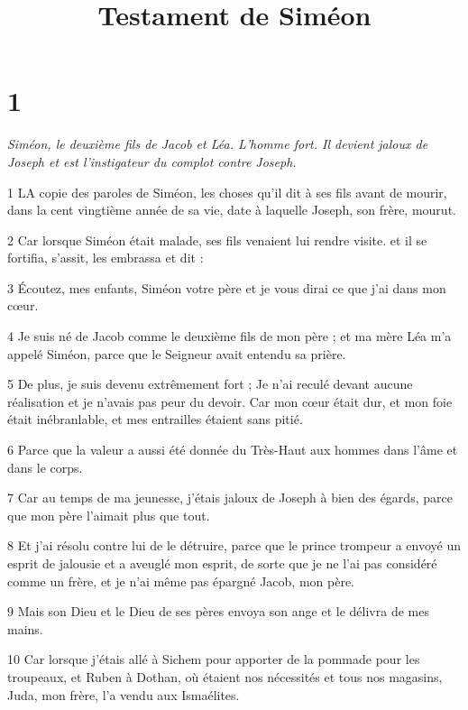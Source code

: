 

\title{Testament de Siméon}

\chapter{1}

\par \textit{Siméon, le deuxième fils de Jacob et Léa. L'homme fort. Il devient jaloux de Joseph et est l'instigateur du complot contre Joseph.}

\par 1 LA copie des paroles de Siméon, les choses qu'il dit à ses fils avant de mourir, dans la cent vingtième année de sa vie, date à laquelle Joseph, son frère, mourut.

\par 2 Car lorsque Siméon était malade, ses fils venaient lui rendre visite. et il se fortifia, s'assit, les embrassa et dit :

\par 3 Écoutez, mes enfants, Siméon votre père et je vous dirai ce que j'ai dans mon cœur.

\par 4 Je suis né de Jacob comme le deuxième fils de mon père ; et ma mère Léa m'a appelé Siméon, parce que le Seigneur avait entendu sa prière.

\par 5 De plus, je suis devenu extrêmement fort ; Je n’ai reculé devant aucune réalisation et je n’avais pas peur du devoir. Car mon cœur était dur, et mon foie était inébranlable, et mes entrailles étaient sans pitié.

\par 6 Parce que la valeur a aussi été donnée du Très-Haut aux hommes dans l'âme et dans le corps.

\par 7 Car au temps de ma jeunesse, j'étais jaloux de Joseph à bien des égards, parce que mon père l'aimait plus que tout.

\par 8 Et j'ai résolu contre lui de le détruire, parce que le prince trompeur a envoyé un esprit de jalousie et a aveuglé mon esprit, de sorte que je ne l'ai pas considéré comme un frère, et je n'ai même pas épargné Jacob, mon père.

\par 9 Mais son Dieu et le Dieu de ses pères envoya son ange et le délivra de mes mains.

\par 10 Car lorsque j'étais allé à Sichem pour apporter de la pommade pour les troupeaux, et Ruben à Dothan, où étaient nos nécessités et tous nos magasins, Juda, mon frère, l'a vendu aux Ismaélites.

